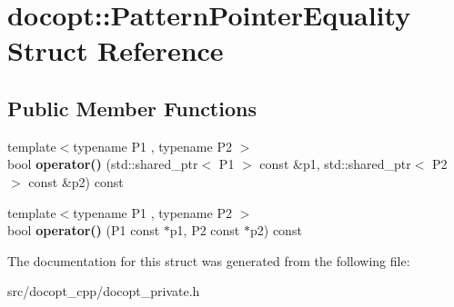 \hypertarget{structdocopt_1_1PatternPointerEquality}{}\section{docopt\+:\+:Pattern\+Pointer\+Equality Struct Reference}
\label{structdocopt_1_1PatternPointerEquality}
\subsection*{Public Member Functions}
\begin{DoxyCompactItemize}
\item 
\mbox{\label{structdocopt_1_1PatternPointerEquality_a9e18a6a036f66503b9426f51210370d3}} 
{\footnotesize template$<$typename P1 , typename P2 $>$ }\\bool {\bfseries operator()} (std\+::shared\+\_\+ptr$<$ P1 $>$ const \&p1, std\+::shared\+\_\+ptr$<$ P2 $>$ const \&p2) const
\item 
\mbox{\label{structdocopt_1_1PatternPointerEquality_a7253b1900c027275af33d0905a8adfcf}} 
{\footnotesize template$<$typename P1 , typename P2 $>$ }\\bool {\bfseries operator()} (P1 const $\ast$p1, P2 const $\ast$p2) const
\end{DoxyCompactItemize}


The documentation for this struct was generated from the following file\+:\begin{DoxyCompactItemize}
\item 
src/docopt\+\_\+cpp/docopt\+\_\+private.\+h\end{DoxyCompactItemize}
